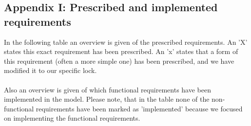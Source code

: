 \documentclass{article}
\begin{document}
\newpage
\subsection*{Appendix I: Prescribed and implemented requirements} 

    In the following table an overview is given of the prescribed requirements. An 'X' states this exact requirement has been prescribed. An 'x' states that a form of this requirement (often a more simple one) has been prescribed, and we have modified it to our specific lock. \\\\
    Also an overview is given of which functional requirements have been implemented in the model. Please note, that in the table none of the non-functional requirements have been marked as 'implemented' because we focused on implementing the functional requirements.  
\end{document}

